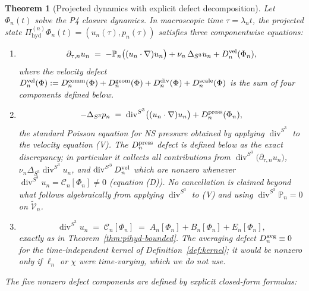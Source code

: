 \documentclass[11pt, a4paper]{amsart}
\newtheorem{theorem}{Theorem}[section]
\theoremstyle{definition}
\newcommand{\Pihyd}{\Pi_{\mathrm{hyd}}}
\newcommand{\divS}{\operatorname{div}^{S^3}}
\newcommand{\LapS}{\Delta_{S^3}}
\newcommand{\Projn}{\mathbb P_n}
\begin{document}
\begin{theorem}[Projected dynamics with explicit defect decomposition]
\label{thm:projected-dynamics}
Let $\Phi_n(t)$ solve the P4 closure dynamics. In macroscopic
time $\tau = \lambda_n t$, the projected state
$\Pihyd^{(n)} \Phi_n(t) = (u_n(\tau), p_n(\tau))$ satisfies
\emph{three componentwise equations}:

\begin{enumerate}
\item[\textbf{(V)} \emph{Velocity equation:}]
  \[
    \partial_{\tau, n} u_n \;=\; -\Projn\bigl((u_n \cdot
    \nabla) u_n\bigr) + \nu_n\,\LapS u_n + D_n^{\rm vel}(\Phi_n),
  \]
  where the velocity defect $D_n^{\rm vel}(\Phi) :=
  D_n^{\rm comm}(\Phi) + D_n^{\rm geom}(\Phi) + D_n^{\rm
  div}(\Phi) + D_n^{\rm scale}(\Phi)$ is the sum of four
  components defined below.

\item[\textbf{(P)} \emph{Pressure equation:}]
  \[
    -\LapS p_n \;=\; \divS\bigl((u_n \cdot \nabla) u_n\bigr)
    + D_n^{\rm press}(\Phi_n),
  \]
  the standard Poisson equation for NS pressure obtained by
  applying $\divS$ to the velocity equation (V). The
  $D_n^{\rm press}$ defect is defined below as the exact
  discrepancy; in particular it collects \emph{all} contributions
  from $\divS\bigl(\partial_{\tau,n} u_n\bigr)$,
  $\nu_n \LapS \divS u_n$, and $\divS D_n^{\rm vel}$ which are
  nonzero whenever $\divS u_n = \mathcal C_n[\Phi_n] \neq 0$
  (equation (D)). No cancellation is claimed beyond what follows
  algebraically from applying $\divS$ to (V) and using
  $\divS \Projn = 0$ on $\widetilde{\mathcal V}_n$.

\item[\textbf{(D)} \emph{Divergence equation:}]
  \[
    \divS u_n \;=\; \mathcal C_n[\Phi_n]
    \;=\; A_n[\Phi_n] + B_n[\Phi_n] + E_n[\Phi_n],
  \]
  exactly as in Theorem~\ref{thm:pihyd-bounded}.
  The averaging defect $D_n^{\rm avg} \equiv 0$ for the
  time-independent kernel of Definition~\ref{def:kernel}; it
  would be nonzero only if $\ell_n$ or $\chi$ were time-varying,
  which we do not use.
\end{enumerate}

The \emph{five nonzero defect components} are defined by
explicit closed-form formulas:


\end{theorem}
\end{document}
